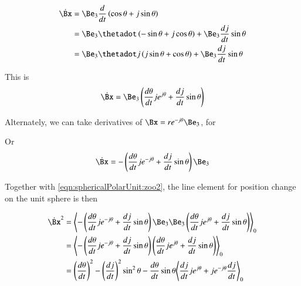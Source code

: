 \begin{align*}
\dot{\Bx} 
&= \Be_3 \frac{d}{dt} \left( \cos\theta + j \sin\theta \right) \\
&= \Be_3 \thetadot \left( -\sin\theta + j \cos\theta \right) + \Be_3 \frac{d j}{dt} \sin\theta  \\
&= \Be_3 \thetadot j \left( j \sin\theta + \cos\theta \right) + \Be_3 \frac{d j}{dt} \sin\theta  \\
\end{align*}

This is
\begin{align}\label{eqn:sphericalPolarUnit:zoo2}
\dot{\Bx} = \Be_3 \left( \frac{d\theta}{dt} j e^{j\theta} + \frac{d j}{dt} \sin\theta \right)
\end{align}

Alternately, we can take derivatives of $\Bx = r e^{-j\theta} \Be_3$, for


Or
\begin{align}\label{eqn:sphericalPolarUnit:zoo3}
\dot{\Bx} = -\left( \frac{d\theta}{dt} j e^{-j\theta} + \frac{d j}{dt} \sin\theta \right) \Be_3
\end{align}

Together with \ref{eqn:sphericalPolarUnit:zoo2}, the line element for position change on the unit sphere is then

\begin{align*}
\dot{\Bx}^2 
&= \gpgradezero{
-\left( \frac{d\theta}{dt} j e^{-j\theta} + \frac{d j}{dt} \sin\theta \right) \Be_3 \Be_3 \left( \frac{d\theta}{dt} j e^{j\theta} + \frac{d j}{dt} \sin\theta \right) } \\
&= \gpgradezero{
-\left( \frac{d\theta}{dt} j e^{-j\theta} + \frac{d j}{dt} \sin\theta \right) \left( \frac{d\theta}{dt} j e^{j\theta} + \frac{d j}{dt} \sin\theta \right) } \\
&=
\left(\frac{d\theta}{dt}\right)^2 - \left(\frac{d j}{dt}\right)^2 \sin^2\theta 
- \frac{d\theta}{dt} \sin\theta 
\gpgradezero{ \frac{dj}{dt} j e^{j\theta} + j e^{-j\theta} \frac{dj}{dt} } \\
\end{align*}

